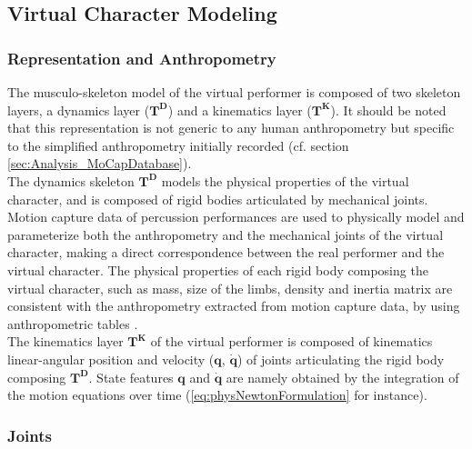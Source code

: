 		\subsection{Virtual Character Modeling}
		\label{subsec:Synthesis_Physics_VirtualCharacterModeling}


			\subsubsection{Representation and Anthropometry}
			\label{subsubsec:Synthesis_Physics_VirtualCharacterModeling_RepAnt}

The musculo-skeleton model of the virtual performer is composed of two skeleton layers, a dynamics layer ($\boldsymbol{T^D}$) and a kinematics layer ($\boldsymbol{T^K}$). It should be noted that this representation is not generic to any human anthropometry but specific to the simplified anthropometry initially recorded (cf. section \ref{sec:Analysis_MoCapDatabase}).\\

The dynamics skeleton $\boldsymbol{T^D}$ models the physical properties of the virtual character, and is composed of rigid bodies articulated by mechanical joints. Motion capture data of percussion performances are used to physically model and parameterize both the anthropometry and the mechanical joints of the virtual character, making a direct correspondence between the real performer and the virtual character. The physical properties of each rigid body composing the virtual character, such as mass, size of the limbs, density and inertia matrix are consistent with the anthropometry extracted from motion capture data, by using anthropometric tables .\\

The kinematics layer $\boldsymbol{T^K}$ of the virtual performer is composed of kinematics linear-angular position and velocity ($\boldsymbol{q}$, $\boldsymbol{\dot{q}}$) of joints articulating the rigid body composing $\boldsymbol{T^D}$. State features $\boldsymbol{q}$ and $\boldsymbol{\dot{q}}$ are namely obtained by the integration of the motion equations over time (\myequname \eqref{eq:physNewtonFormulation} for instance).


			\subsubsection{Joints}
			\label{subsubsec:Synthesis_Physics_VirtualCharacterModeling_Joints}

